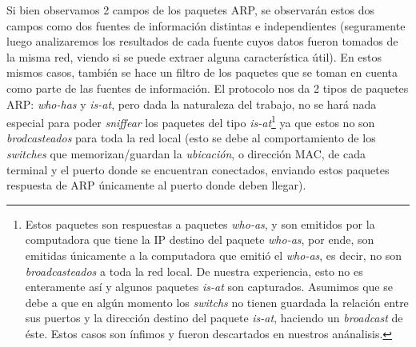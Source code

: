 \par Si bien observamos 2 campos de los paquetes ARP, se observar\'an estos dos
	campos como dos fuentes de informaci\'on distintas e independientes (seguramente
    luego analizaremos los resultados de cada fuente cuyos datos fueron tomados
    de la misma red, viendo si se puede extraer alguna caracter\'istica \'util).
    En estos mismos casos, tambi\'en se hace un filtro de los paquetes que se toman
    en cuenta como parte de las fuentes de informaci\'on. El protocolo nos da 2 tipos
    de paquetes ARP: \textit{who-has} y \textit{is-at}, pero dada la naturaleza del
    trabajo, no se har\'a nada especial para poder \textit{sniffear} los paquetes
    del tipo \textit{is-at}\footnote{Estos paquetes son respuestas a paquetes
    \textit{who-as}, y son emitidos por la computadora que tiene la IP destino
    del paquete \textit{who-as}, por ende, son emitidas \'unicamente a la computadora
    que emiti\'o el \textit{who-as}, es decir, no son \textit{broadcasteados}
    a toda la red local. De nuestra experiencia, esto no es enteramente as\'i y
    algunos paquetes \textit{is-at} son capturados. Asumimos que se debe a que
    en alg\'un momento los \textit{switchs} no tienen guardada la relaci\'on
    entre sus puertos y la direcci\'on destino del paquete \textit{is-at}, haciendo
    un \textit{broadcast} de \'este. Estos casos son \'infimos y fueron descartados
    en nuestros an\'analisis.} ya que estos no son \textit{brodcasteados} para
    toda la red local (esto se debe al comportamiento de los \textit{switches} que
    memorizan/guardan la \textit{ubicaci\'on}, o direcci\'on MAC, de cada terminal
    y el puerto donde se encuentran conectados, enviando estos paquetes respuesta
    de ARP \'unicamente al puerto donde deben llegar).